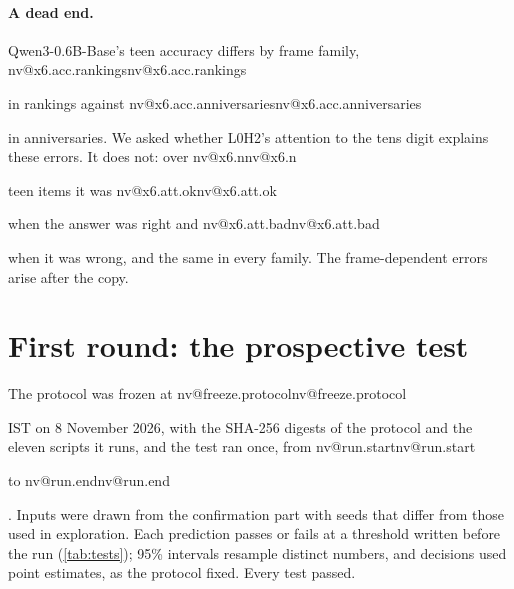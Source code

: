 \documentclass[11pt]{article}
\makeatletter
\newcommand{\nv}[1]{\ifcsname nv@#1\endcsname\csname nv@#1\endcsname\else\PackageError{numbers}{Unknown number key #1}{}\fi}
\newcommand{\qw}{Qwen3-0.6B-Base}
\newcommand{\hd}[2]{L#1H#2}
\makeatother
\begin{document}
\paragraph{A dead end.} \qw{}'s teen accuracy differs by frame family, \nv{x6.acc.rankings} in rankings against \nv{x6.acc.anniversaries} in anniversaries. We asked whether \hd{0}{2}'s attention to the tens digit explains these errors. It does not: over \nv{x6.n} teen items it was \nv{x6.att.ok} when the answer was right and \nv{x6.att.bad} when it was wrong, and the same in every family. The frame-dependent errors arise after the copy.

\section{First round: the prospective test}
\label{sec:test}

The protocol was frozen at \nv{freeze.protocol} IST on 8 November 2026, with the SHA-256 digests of the protocol and the eleven scripts it runs, and the test ran once, from \nv{run.start} to \nv{run.end}. Inputs were drawn from the confirmation part with seeds that differ from those used in exploration. Each prediction passes or fails at a threshold written before the run (\cref{tab:tests}); 95\% intervals resample distinct numbers, and decisions used point estimates, as the protocol fixed. Every test passed.
\end{document}
